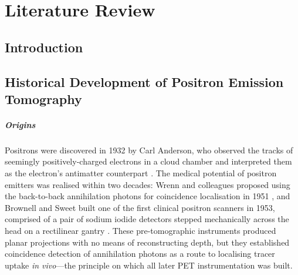 \chapter{Literature Review}
\label{ch:literature-review}

\section{Introduction}
\label{sec:review-introduction}

\section{Historical Development of Positron Emission Tomography}
\label{sec:history}

\paragraph{Origins}
Positrons were discovered in 1932 by Carl Anderson, who observed the tracks of seemingly positively-charged electrons in a cloud chamber and interpreted them as the electron's antimatter counterpart \cite{Anderson1933}.
The medical potential of positron emitters was realised within two decades: Wrenn and colleagues proposed using the back-to-back annihilation photons for coincidence localisation in 1951 \cite{Wrenn1951}, and Brownell and Sweet built one of the first clinical positron scanners in 1953, comprised of a pair of sodium iodide detectors stepped mechanically across the head on a rectilinear gantry \cite{Sweet1953}.
These pre-tomographic instruments produced planar projections with no means of reconstructing depth, but they established coincidence detection of annihilation photons as a route to localising tracer uptake \emph{in vivo}---the principle on which all later PET instrumentation was built.

